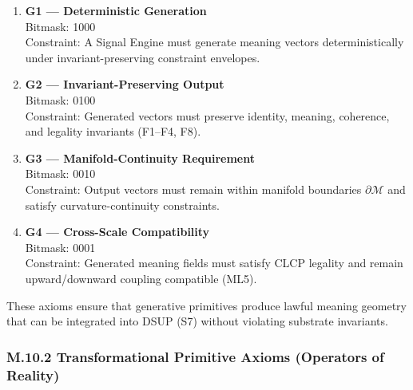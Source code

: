 \begin{enumerate}
    \item \textbf{G1 — Deterministic Generation} \\
    Bitmask: 1000 \\
    Constraint: A Signal Engine must generate meaning vectors deterministically
    under invariant-preserving constraint envelopes.

    \item \textbf{G2 — Invariant-Preserving Output} \\
    Bitmask: 0100 \\
    Constraint: Generated vectors must preserve identity, meaning, coherence,
    and legality invariants (F1–F4, F8).

    \item \textbf{G3 — Manifold-Continuity Requirement} \\
    Bitmask: 0010 \\
    Constraint: Output vectors must remain within manifold boundaries
    $\partial\mathcal{M}$ and satisfy curvature-continuity constraints.

    \item \textbf{G4 — Cross-Scale Compatibility} \\
    Bitmask: 0001 \\
    Constraint: Generated meaning fields must satisfy CLCP legality and remain
    upward/downward coupling compatible (ML5).
\end{enumerate}

These axioms ensure that generative primitives produce lawful meaning geometry
that can be integrated into DSUP (S7) without violating substrate invariants.


\subsubsection*{M.10.2 Transformational Primitive Axioms (Operators of Reality)}

